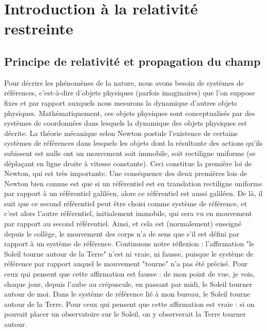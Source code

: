\chapter{Introduction à la relativité restreinte}
	\section{Principe de relativité et propagation du champ}
		Pour décrire les phénomènes de la nature, nous avons besoin de systèmes de références, c'est-à-dire d'objets physiques (parfois imaginaires) que l'on suppose fixes et par rapport auxquels nous mesurons la dynamique d'autres objets physiques. Mathématiquement, ces objets physiques sont conceptualisés par des systèmes de coordonnées dans lesquels la dynamique des objets physiques est décrite. La théorie mécanique selon Newton postule l'existence de certains systèmes de références dans lesquels les objets dont la résultante des actions qu'ils subissent est nulle ont un mouvement soit immobile, soit rectiligne uniforme (se déplaçant en ligne droite à vitesse constante). Ceci constitue la première loi de Newton, qui est très importante. Une conséquence des deux premières lois de Newton bien connue est que si un référentiel est en translation rectiligne uniforme par rapport à un référentiel galiléen, alors ce référentiel est aussi galiléen. De là, il suit que ce second référentiel peut être choisi comme système de référence, et c'est alors l'autre référentiel, initialement immobile, qui sera vu en mouvement par rapport au second référentiel. Ainsi, et cela est (normalement) enseigné depuis le collège, le mouvement des corps n'a de sens que s'il est défini par rapport à un système de référence. Continuons notre réflexion : l'affirmation "le Soleil tourne autour de la Terre" n'est ni vraie, ni fausse, puisque le système de référence par rapport auquel le mouvement "tourne" n'a pas été précisé. Pour ceux qui pensent que cette affirmation est fausse : de mon point de vue, je vois, chaque jour, depuis l'aube au crépuscule, en passant par midi, le Soleil tourner autour de moi. Dans le système de référence lié à mon bureau, le Soleil tourne autour de la Terre. Pour ceux qui pensent que cette affirmation est vraie : si on pouvait placer un observatoire sur le Soleil, on y observerait la Terre tourner autour.


